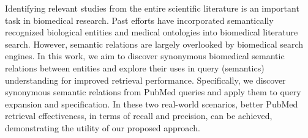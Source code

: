 Identifying relevant studies from the entire scientific literature is an important task in biomedical research. Past efforts have incorporated semantically recognized biological entities and medical ontologies into biomedical literature search. However, semantic relations are largely overlooked by biomedical search engines. In this work, we aim to discover synonymous biomedical semantic relations between entities and explore their uses in query (semantics) understanding for improved retrieval performance. Specifically, we discover synonymous semantic relations from PubMed queries and apply them to query expansion and specification. In these two real-world scenarios, better PubMed retrieval effectiveness, in terms of recall and precision, can be achieved, demonstrating the utility of our proposed approach.
